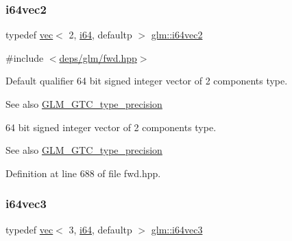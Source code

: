 \mbox{\label{group__gtc__type__precision_ga8654a1b3a6f81677f53eec13f8dd4224}} 
\subsubsection{\texorpdfstring{i64vec2}{i64vec2}}
{\footnotesize\ttfamily typedef \hyperlink{structglm_1_1vec}{vec}$<$ 2, \hyperlink{group__gtc__type__precision_gac7a7eaad46064fc952b06df33689da23}{i64}, defaultp $>$ \hyperlink{group__gtc__type__precision_ga8654a1b3a6f81677f53eec13f8dd4224}{glm\+::i64vec2}}



{\ttfamily \#include $<$\hyperlink{fwd_8hpp}{deps/glm/fwd.\+hpp}$>$}

Default qualifier 64 bit signed integer vector of 2 components type. \begin{DoxySeeAlso}{See also}
\hyperlink{group__gtc__type__precision}{G\+L\+M\+\_\+\+G\+T\+C\+\_\+type\+\_\+precision}
\end{DoxySeeAlso}
64 bit signed integer vector of 2 components type. \begin{DoxySeeAlso}{See also}
\hyperlink{group__gtc__type__precision}{G\+L\+M\+\_\+\+G\+T\+C\+\_\+type\+\_\+precision} 
\end{DoxySeeAlso}


Definition at line 688 of file fwd.\+hpp.

\mbox{\label{group__gtc__type__precision_gad7aa290b2d88847999c1305ed5c82669}} 
\subsubsection{\texorpdfstring{i64vec3}{i64vec3}}
{\footnotesize\ttfamily typedef \hyperlink{structglm_1_1vec}{vec}$<$ 3, \hyperlink{group__gtc__type__precision_gac7a7eaad46064fc952b06df33689da23}{i64}, defaultp $>$ \hyperlink{group__gtc__type__precision_gad7aa290b2d88847999c1305ed5c82669}{glm\+::i64vec3}}



